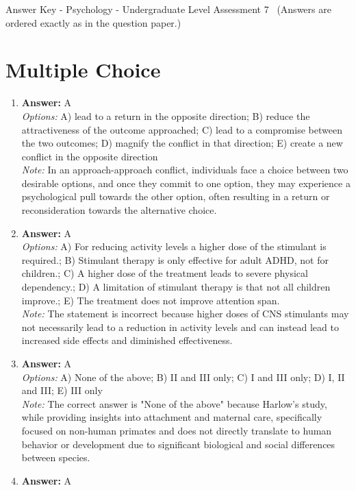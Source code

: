 \documentclass[12pt]{article}
\begin{document}
\begin{center}
Answer Key - Psychology - Undergraduate Level Assessment 7 \
\small (Answers are ordered exactly as in the question paper.)
\end{center}

\section*{Multiple Choice}
\begin{enumerate}[label=\arabic*.]
\item \textbf{Answer:} A
\\ \textit{Options:} A) lead to a return in the opposite direction; B) reduce the attractiveness of the outcome approached; C) lead to a compromise between the two outcomes; D) magnify the conflict in that direction; E) create a new conflict in the opposite direction
\\ \textit{Note:} In an approach-approach conflict, individuals face a choice between two desirable options, and once they commit to one option, they may experience a psychological pull towards the other option, often resulting in a return or reconsideration towards the alternative choice.
\item \textbf{Answer:} A
\\ \textit{Options:} A) For reducing activity levels a higher dose of the stimulant is required.; B) Stimulant therapy is only effective for adult ADHD, not for children.; C) A higher dose of the treatment leads to severe physical dependency.; D) A limitation of stimulant therapy is that not all children improve.; E) The treatment does not improve attention span.
\\ \textit{Note:} The statement is incorrect because higher doses of CNS stimulants may not necessarily lead to a reduction in activity levels and can instead lead to increased side effects and diminished effectiveness.
\item \textbf{Answer:} A
\\ \textit{Options:} A) None of the above; B) II and III only; C) I and III only; D) I, II and III; E) III only
\\ \textit{Note:} The correct answer is "None of the above" because Harlow's study, while providing insights into attachment and maternal care, specifically focused on non-human primates and does not directly translate to human behavior or development due to significant biological and social differences between species.
\item \textbf{Answer:} A

\end{enumerate}
\end{document}
